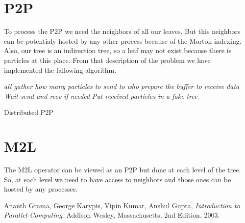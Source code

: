 \documentclass[10pt,letterpaper,titlepage]{report}
\begin{document}
\section{P2P}
To process the P2P we need the neighbors of all our leaves.
But this neighbors can be potentialy hosted by any other process because of the Morton indexing.
Also, our tree is an indirection tree, so a leaf may not exist because there is particles at this place.
From that description of the problem we have implemented the fallowing algorithm.

\begin{algorithm}[H]
\SetLine
{}
\BlankLine

\emph{all gather how many particles to send to who}\;
\emph{prepare the buffer to receive data}\;
\emph{Wait send and recv if needed}\;
\emph{Put received particles in a fake tree}\;

\BlankLine
\caption{Distributed P2P}
\end{algorithm}

\section{M2L}
The M2L operator can be viewed as an P2P but done at each level of the tree.
So, at each level we need to have access to neighbors and those ones can be hosted by any processes.




\begin{thebibliography}{9}

   Ananth Grama, George Karypis, Vipin Kumar, Anshul Gupta,
   \emph{Introduction to Parallel Computing}.
   Addison Wesley, Massachusetts,
   2nd Edition,
   2003.

\end{thebibliography}
\end{document}
